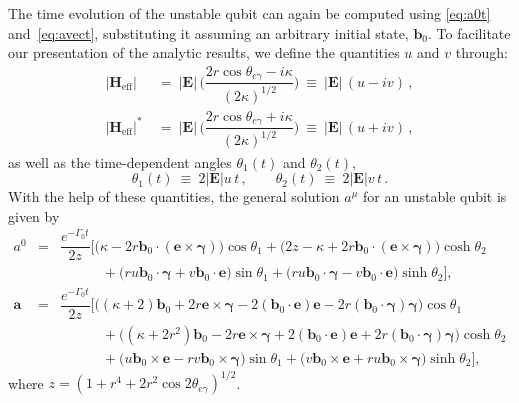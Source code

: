 \documentclass[12pt,a4paper]{article}
\begin{document}
The time evolution of the unstable qubit can again be computed using \eqref{eq:a0t} and~\eqref{eq:avect}, substituting it assuming an arbitrary initial state, $\mathbf{b}_0$. 
To facilitate our presentation of the analytic results, we define the quantities $u$ and $v$ through:
\begin{equation}
    \begin{aligned}
        |\mathbf{H}_{\text{eff}}|\: &=\:  |\mathbf{E}|\,\bigg(\dfrac{2r\cos{\theta_{e\gamma}}-i\kappa}{(2\kappa)^{1/2}}\bigg)\: \equiv\: |\mathbf{E}|\,(u-iv)\,,\\[2mm]
        |\mathbf{H}_{\text{eff}}|^*\: &=\: |\mathbf{E}|\,\bigg(\dfrac{2r\cos{\theta_{e\gamma}}+i\kappa}{(2\kappa)^{1/2}}\bigg)\: \equiv\: |\mathbf{E}|\,(u+iv)\,,
    \end{aligned}
\end{equation}
as well as the time-dependent angles $\theta_1(t)$ and $\theta_2(t)$,
\begin{equation}
    \theta_1(t)\: \equiv\: 2|\mathbf{E}|u\, t\,, \qquad \theta_2(t)\: \equiv\: 2|\mathbf{E}|v\,t\,.
\end{equation}
With the help of these quantities, the general solution $a^\mu$ for an unstable qubit is given by
\begin{eqnarray}
        a^0 &=& \dfrac{e^{-\Gamma_0 t}}{2z}\Big[\Big(\kappa-2r\mathbf{b}_0\cdot(\mathbf{e\times}\boldsymbol{\gamma})\Big)\cos{\theta_1} + \Big(2z-\kappa+2r\mathbf{b}_0\cdot(\mathbf{e\times}\boldsymbol{\gamma})\Big)\cosh{\theta_2}
        \nonumber\\
        &&\quad\quad\quad
        +\Big(ru\mathbf{b}_0\cdot \boldsymbol{\gamma}+v\mathbf{b}_0\cdot \boldsymbol{e}\Big)\sin{\theta_1}+\Big(ru\mathbf{b}_0\cdot \boldsymbol{\gamma}-v\mathbf{b}_0\cdot \boldsymbol{e}\Big)\sinh{\theta_2}\Big],\\[2mm]
        \mathbf{a} &=& \dfrac{e^{-\Gamma_0 t}}{2z}\Big[\Big((\kappa+2)\mathbf{b}_0+2r\mathbf{e}\times\boldsymbol{\gamma}-2(\mathbf{b}_0\cdot\mathbf{e})\mathbf{e}-2r(\mathbf{b}_0\cdot\boldsymbol{\gamma})\boldsymbol{\gamma}\Big)\cos{\theta_1}\nonumber\\
        &&\quad\quad\quad
        +\Big((\kappa+2r^2)\mathbf{b}_0-2r\mathbf{e}\times \boldsymbol{\gamma}+2(\mathbf{b}_0\cdot\mathbf{e})\mathbf{e}+2r(\mathbf{b}_0\cdot\boldsymbol{\gamma})\boldsymbol{\gamma}\Big)\cosh{\theta_2}\nonumber\\
        &&\quad\quad\quad
        +\Big(u\mathbf{b}_0\times\mathbf{e}-rv\mathbf{b}_0\times\boldsymbol{\gamma}\Big)\sin{\theta_1}+\Big(v\mathbf{b}_0\times\mathbf{e}+ ru\mathbf{b}_0\times\boldsymbol{\gamma}\Big)\sinh{\theta_2}\Big],
\end{eqnarray}
where $z = (1+r^4+2r^2\cos{2\theta_{e\gamma}})^{1/2}$.
\end{document}
